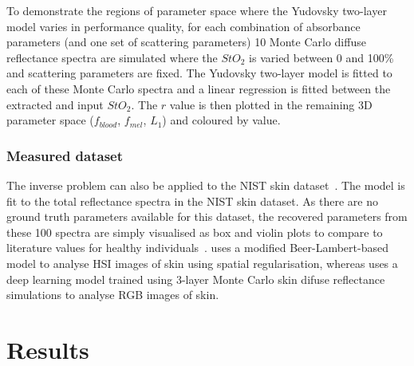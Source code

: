 
To demonstrate the regions of parameter space where the Yudovsky two-layer model varies in performance quality, for each combination of absorbance parameters (and one set of scattering parameters) 10 Monte Carlo diffuse reflectance spectra are simulated where the $StO_2$ is varied between 0 and 100\% and scattering parameters are fixed. The Yudovsky two-layer model is fitted to each of these Monte Carlo spectra and a linear regression is fitted between the extracted and input $StO_2$. The $r$ value is then plotted in the remaining 3D parameter space ($f_{blood}$, $f_{mel}$, $L_1$) and coloured by value.

\subsubsection{Measured dataset}
The inverse problem can also be applied to the NIST skin dataset~\citep{Cooksey2017}. The model is fit to the total reflectance spectra in the NIST skin dataset. As there are no ground truth parameters available for this dataset, the recovered parameters from these 100 spectra are simply visualised as box and violin plots to compare to literature values for healthy individuals~\citep{Jacques2013, VanManen2021, Nishidate2011, Lintzeri2022}. \citet{VanManen2021} uses a modified Beer-Lambert-based model to analyse HSI images of skin using spatial regularisation, whereas \citet{Nishidate2011} uses a deep learning model trained using 3-layer Monte Carlo skin difuse reflectance simulations to analyse RGB images of skin. 

\section{Results}\label{sec:results2}

